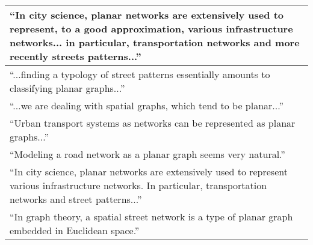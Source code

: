 \begin{tabular}{ | p{\textwidth} | }
\enquote{In city science, planar networks are extensively used to represent, to a good approximation, various infrastructure networks... in particular, transportation networks and more recently streets patterns...} \citep[p.~1]{viana_simplicity_2013} \\ \hline

\enquote{...finding a typology of street patterns essentially amounts to classifying planar graphs...} \citep[p.~2]{louf_typology_2014} \\ \hline

\enquote{...we are dealing with spatial graphs, which tend to be planar...} \citep[p.~2191]{zhong_detecting_2014} \\ \hline

\enquote{Urban transport systems as networks can be represented as planar graphs...} \citep[p.~2]{wang_resilience_2015} \\ \hline

\enquote{Modeling a road network as a planar graph seems very natural.} \citep[p.~42]{aldous_routed_2016} \\ \hline

\enquote{In city science, planar networks are extensively used to represent various infrastructure networks. In particular, transportation networks and street patterns...} \citep[p.~257]{barthelemy_paths_2017} \\ \hline

\enquote{In graph theory, a spatial street network is a type of planar graph embedded in Euclidean space.} \citep[p.~168]{law_defining_2017} \\ \hline

\end{tabular}

